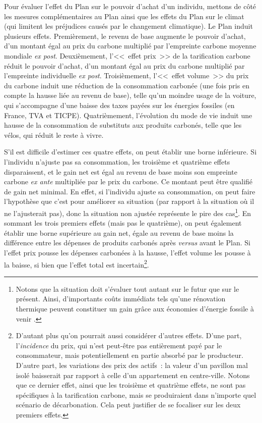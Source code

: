\documentclass[a5paper,french,openany]{memoir}
\begin{document}
Pour évaluer l'effet du Plan sur le pouvoir d'achat d'un individu, mettons de côté les mesures complémentaires au Plan ainsi que les effets du Plan sur le climat (qui limitent les préjudices causés par le changement climatique). Le Plan induit plusieurs effets. Premièrement, le revenu de base augmente le pouvoir d'achat, d'un montant égal au prix du carbone multiplié par l'empreinte carbone moyenne mondiale \textit{ex post}. Deuxièmement, l'<<~effet prix~>> de la tarification carbone réduit le pouvoir d'achat, d'un montant égal au prix du carbone multiplié par l'empreinte individuelle \textit{ex post}. Troisièmement, l'<<~effet volume~>> du prix du carbone induit une réduction de la consommation carbonée (une fois pris en compte la hausse liée au revenu de base), telle qu'un moindre usage de la voiture, qui s'accompagne d'une baisse des taxes payées sur les énergies fossiles (en France, TVA et TICPE). Quatrièmement, l'évolution du mode de vie induit une hausse de la consommation de substituts aux produits carbonés, telle que les vélos, qui réduit le reste à vivre. 

S'il est difficile d'estimer ces quatre effets, on peut établir une borne inférieure. Si l'individu n'ajuste pas sa consommation, les troisième et quatrième effets disparaissent, et le gain net est égal au revenu de base moins son empreinte carbone \textit{ex ante} multipliée par le prix du carbone. Ce montant peut être qualifié de gain net minimal. En effet, si l'individu ajuste sa consommation, on peut faire l'hypothèse que c'est pour améliorer sa situation (par rapport à la situation où il ne l'ajusterait pas), donc la situation non ajustée représente le pire des cas\footnote{Notons que la situation doit s'évaluer tout autant sur le futur que sur le présent. Ainsi, d'importants coûts immédiats  tels qu'une rénovation thermique peuvent constituer un gain grâce aux économies d'énergie fossile à venir%
.}. En sommant les trois premiers effets (mais pas le quatrième), on peut également établir une borne supérieure au gain net, égale au revenu de base moins la différence entre les dépenses de produits carbonés après \textit{versus} avant le Plan. 
Si l'effet prix pousse les dépenses carbonées à la hausse, l'effet volume les pousse à la baisse, si bien que l'effet total est incertain\footnote{D'autant plus qu'on pourrait aussi considérer d'autres effets. D'une part, l'\textit{incidence} du prix, qui n'est peut-être pas entièrement payé par le consommateur, mais potentiellement en partie absorbé par le producteur. D'autre part, les variations des prix des actifs~: la valeur d'un pavillon mal isolé baisserait par rapport à celle d'un appartement en centre-ville. Notons que ce dernier effet, ainsi que les troisième et quatrième effets, ne sont pas spécifiques à la tarification carbone, mais se produiraient dans n'importe quel scénario de décarbonation. Cela peut justifier de se focaliser sur les deux premiers effets.}. 
\end{document}
